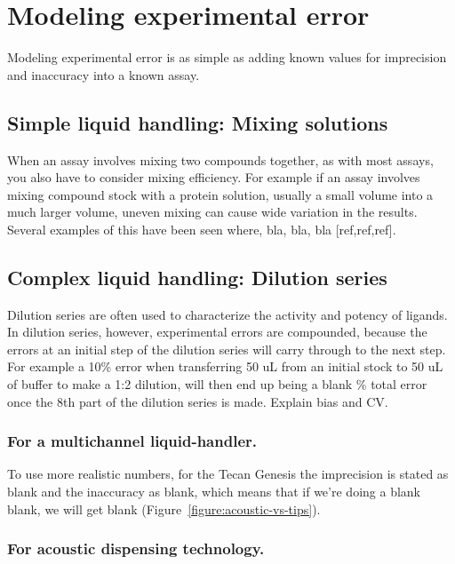 \documentclass[aps,pre,twocolumn,nofootinbib,superscriptaddress,linenumbers]{revtex4-1}
\begin{document}
\section*{Modeling experimental error}

Modeling experimental error is as simple as adding known values for imprecision and inaccuracy into a known assay. 

\subsection*{Simple liquid handling: Mixing solutions}

When an assay involves mixing two compounds together, as with most assays, you also have to consider mixing efficiency. For example if an assay involves mixing compound stock with a protein solution, usually a small volume into a much larger volume, uneven mixing can cause wide variation in the results. Several examples of this have been seen where, bla, bla, bla [ref,ref,ref].

\subsection*{Complex liquid handling: Dilution series}

Dilution series are often used to characterize the activity and potency of ligands. In dilution series, however, experimental errors are compounded, because the errors at an initial step of the dilution series will carry through to the next step. For example a 10\% error when transferring 50 uL from an initial stock to 50 uL of buffer to make a 1:2 dilution, will then end up being a blank \% total error once the 8th part of the dilution series is made. Explain bias and CV.

\subsubsection*{For a multichannel liquid-handler.}

To use more realistic numbers, for the Tecan Genesis the imprecision is stated as blank and the inaccuracy as blank, which means that if we're doing a blank blank, we will get blank (Figure~\ref{figure:acoustic-vs-tips}).  

\subsubsection*{For acoustic dispensing technology.}
\end{document}
